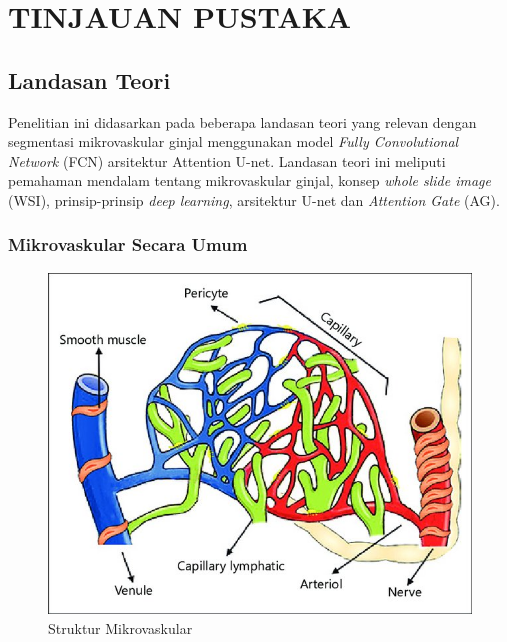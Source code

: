 \chapter{TINJAUAN PUSTAKA}


\section{Landasan Teori}
\noindent Penelitian ini didasarkan pada beberapa landasan teori yang relevan dengan segmentasi mikrovaskular ginjal menggunakan model \textit{Fully Convolutional Network} (FCN) arsitektur Attention U-net. Landasan teori ini meliputi pemahaman mendalam tentang mikrovaskular ginjal, konsep \textit{whole slide image} (WSI), prinsip-prinsip \textit{deep learning}, arsitektur U-net dan \textit{Attention Gate} (AG).

\subsection{Mikrovaskular Secara Umum}

\begin{figure}[H]
	\centering
	\includegraphics[scale=1]{gambar/mikrovaskular.jpg}
	\caption{ Struktur Mikrovaskular \cite{guven_microcirculation_2020}}
	\label{fig:mikrovaskular}
\end{figure}


